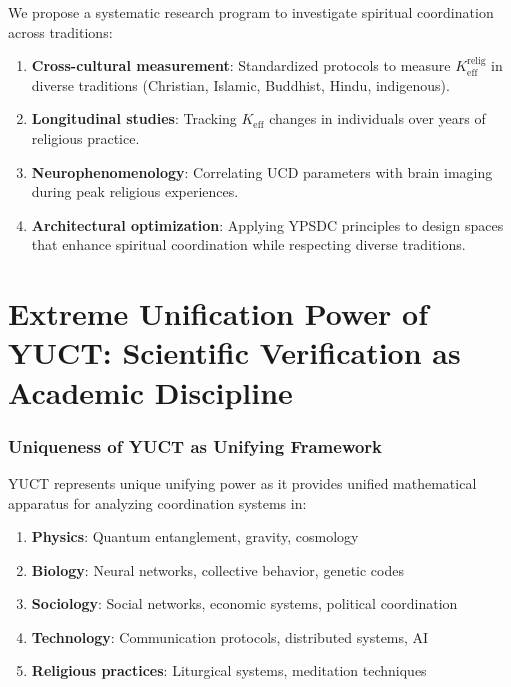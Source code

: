 \documentclass[12pt,a4paper]{article}
\begin{document}
	We propose a systematic research program to investigate spiritual coordination across traditions:
	
	\begin{enumerate}
		\item \textbf{Cross-cultural measurement}: Standardized protocols to measure $K_{\mathrm{eff}}^{\mathrm{relig}}$ in diverse traditions (Christian, Islamic, Buddhist, Hindu, indigenous).
		
		\item \textbf{Longitudinal studies}: Tracking $K_{\mathrm{eff}}$ changes in individuals over years of religious practice.
		
		\item \textbf{Neurophenomenology}: Correlating UCD parameters with brain imaging during peak religious experiences.
		
		\item \textbf{Architectural optimization}: Applying YPSDC principles to design spaces that enhance spiritual coordination while respecting diverse traditions.
	\end{enumerate}
	
	\newpage
	\part{Extreme Unification Power of YUCT: Scientific Verification as Academic Discipline}
	
	\section{Uniqueness of YUCT as Unifying Framework}
	
	YUCT represents unique unifying power as it provides unified mathematical apparatus for analyzing coordination systems in:
	
	\begin{enumerate}
		\item \textbf{Physics}: Quantum entanglement, gravity, cosmology
		\item \textbf{Biology}: Neural networks, collective behavior, genetic codes
		\item \textbf{Sociology}: Social networks, economic systems, political coordination
		\item \textbf{Technology}: Communication protocols, distributed systems, AI
		\item \textbf{Religious practices}: Liturgical systems, meditation techniques
	\end{enumerate}
	
\end{document}
